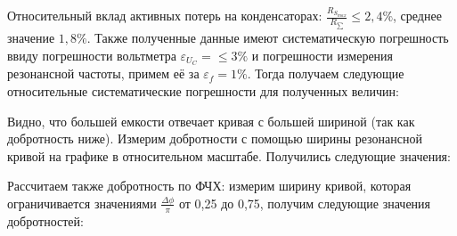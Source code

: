 \documentclass[a4paper, 12pt]{article}
\begin{document}
	Относительный вклад активных потерь на конденсаторах: $\frac{R_{S_{max}}}{R_{\sum}} \leq 2,4 \% $, среднее значение $1,8 \%$. Также полученные данные имеют систематическую погрешность ввиду погрешности вольтметра $\varepsilon_{U_C} = \leq 3\%$ и погрешности измерения резонансной частоты, примем её за $\varepsilon_f = 1 \%$. Тогда получаем следующие относительные систематические погрешности для полученных величин:



	Видно, что большей емкости отвечает кривая с большей шириной (так как добротность ниже). Измерим добротности с помощью ширины резонансной кривой на графике в относительном масштабе. Получились следующие значения:


	Рассчитаем также добротность по ФЧХ: измерим ширину кривой, которая ограничивается значениями $\frac{\Delta \phi}{\pi}$ от 0,25 до 0,75, получим следующие значения добротностей:
\end{document}
